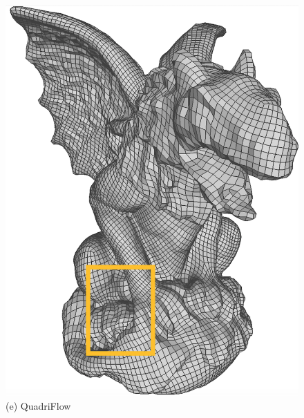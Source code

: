 \begin{figure}
\begin{minipage}{0.16\textwidth}
  \includegraphics[width=\textwidth,height=1.33\textwidth]{quadriflow/teaser/teasers1.png}\\
   (e) QuadriFlow
   \end{minipage}
    \begin{minipage}{0.16\textwidth}
     \centering

\end{minipage}
\end{figure}
